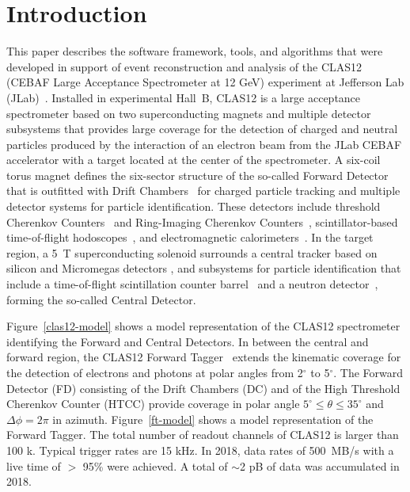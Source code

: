 \section{Introduction}

This paper describes the software framework, tools, and algorithms that were developed in support of event
reconstruction and analysis of the CLAS12 (CEBAF Large Acceptance Spectrometer at 12 GeV) experiment at
Jefferson Lab (JLab)~\cite{clas12-nim}. Installed in experimental Hall~B, CLAS12 is a large acceptance
spectrometer based on two superconducting magnets and multiple detector subsystems that provides large
coverage for the detection of charged and neutral particles produced by the interaction of an electron beam
from the JLab CEBAF accelerator with a target located at the center of the spectrometer. A six-coil torus
magnet defines the six-sector structure of the so-called Forward Detector that is outfitted with Drift
Chambers~\cite{dc-nim} for charged particle tracking and multiple detector systems for particle identification.
These detectors include threshold Cherenkov Counters~\cite{ltcc-nim,htcc-nim} and Ring-Imaging Cherenkov
Counters~\cite{rich-nim}, scintillator-based time-of-flight hodoscopes~\cite{ftof-nim}, and electromagnetic
calorimeters~\cite{ecal-nim}. In the target region, a 5~T superconducting solenoid surrounds a central tracker
based on silicon and Micromegas detectors \cite{svt-nim,mm-nim}, and subsystems for particle identification
that include a time-of-flight scintillation counter barrel~\cite{ctof-nim} and a neutron detector~\cite{cnd-nim},
forming the so-called Central Detector.

Figure~\ref{clas12-model} shows a model representation of the CLAS12 spectrometer identifying the Forward
and Central Detectors. In between the central and forward region, the CLAS12 Forward Tagger~\cite{ft-nim}
extends the kinematic coverage for the detection of electrons and photons at polar angles from 2$^\circ$ to
5$^\circ$. The Forward Detector (FD) consisting of the Drift Chambers  (DC) and of the High Threshold Cherenkov Counter (HTCC) provide coverage in polar angle
$5^\circ \le \theta \le 35^\circ$ and $\Delta \phi = 2\pi$ in azimuth. Figure~\ref{ft-model} shows a model representation of the Forward Tagger. The total number of
readout channels of CLAS12 is larger than 100 k.
Typical trigger rates are 15 kHz.  In 2018, data rates of  500~MB/s with a live time of $>$ 95\% were achieved.  A total of $\sim$2 pB of data was accumulated in 2018.

